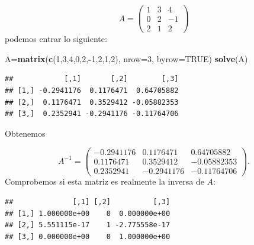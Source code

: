 \documentclass[]{book}
\newenvironment{Shaded}{\begin{snugshade}}{\end{snugshade}}
\newcommand{\DataTypeTok}[1]{\textcolor[rgb]{0.13,0.29,0.53}{#1}}
\newcommand{\DecValTok}[1]{\textcolor[rgb]{0.00,0.00,0.81}{#1}}
\newcommand{\KeywordTok}[1]{\textcolor[rgb]{0.13,0.29,0.53}{\textbf{#1}}}
\newcommand{\NormalTok}[1]{#1}
\newcommand{\OperatorTok}[1]{\textcolor[rgb]{0.81,0.36,0.00}{\textbf{#1}}}
\newcommand{\OtherTok}[1]{\textcolor[rgb]{0.56,0.35,0.01}{#1}}
\theoremstyle{definition}
\theoremstyle{definition}
\theoremstyle{definition}
\theoremstyle{remark}
\begin{document}
\[
A=\left(\begin{array}{ccc}
1 & 3 & 4 \\ 0 & 2 & -1 \\ 2 & 1 & 2\end{array}
\right)
\]
podemos entrar lo siguiente:

\begin{Shaded}
\begin{Highlighting}[]
\NormalTok{A=}\KeywordTok{matrix}\NormalTok{(}\KeywordTok{c}\NormalTok{(}\DecValTok{1}\NormalTok{,}\DecValTok{3}\NormalTok{,}\DecValTok{4}\NormalTok{,}\DecValTok{0}\NormalTok{,}\DecValTok{2}\NormalTok{,}\OperatorTok{-}\DecValTok{1}\NormalTok{,}\DecValTok{2}\NormalTok{,}\DecValTok{1}\NormalTok{,}\DecValTok{2}\NormalTok{), }\DataTypeTok{nrow=}\DecValTok{3}\NormalTok{, }\DataTypeTok{byrow=}\OtherTok{TRUE}\NormalTok{)}
\KeywordTok{solve}\NormalTok{(A) }
\end{Highlighting}
\end{Shaded}

\begin{verbatim}
##            [,1]       [,2]        [,3]
## [1,] -0.2941176  0.1176471  0.64705882
## [2,]  0.1176471  0.3529412 -0.05882353
## [3,]  0.2352941 -0.2941176 -0.11764706
\end{verbatim}

Obtenemos

\[
A^{-1}=\left(\begin{array}{ccc}
-0.2941176 & 0.1176471 & 0.64705882\\
0.1176471 & 0.3529412 & -0.05882353\\
0.2352941 & -0.2941176 & -0.11764706
\end{array}
\right).
\]
Comprobemos si esta matriz es realmente la inversa de \(A\):

\begin{Shaded}
\end{Shaded}

\begin{verbatim}
##              [,1] [,2]          [,3]
## [1,] 1.000000e+00    0  0.000000e+00
## [2,] 5.551115e-17    1 -2.775558e-17
## [3,] 0.000000e+00    0  1.000000e+00
\end{verbatim}

\begin{Shaded}
\end{Shaded}
\end{document}
